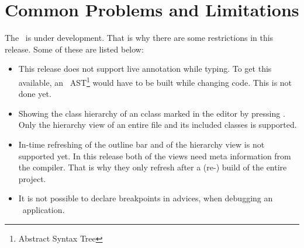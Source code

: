 \section{Common Problems and Limitations}
The \cjdt ~is under development. That is why there are some restrictions in this release. Some of these are listed below:
\begin{itemize}
	\item This release does not support live annotation while typing. To get this available, an \caesarj ~AST\footnote{Abstract Syntax Tree} would have to be built while changing code. This is not done yet.
	\item Showing the class hierarchy of an cclass marked in the editor by pressing . Only the hierarchy view of an entire file and its included classes is supported.
	\item In-time refreshing of the outline bar and of the hierarchy view is not supported yet. In this release both of the views need meta information from the compiler. That is why they only refresh after a (re-) build of the entire project.
	\item It is not possible to declare breakpoints in advices, when debugging an \caesarj ~application.
\end{itemize}
